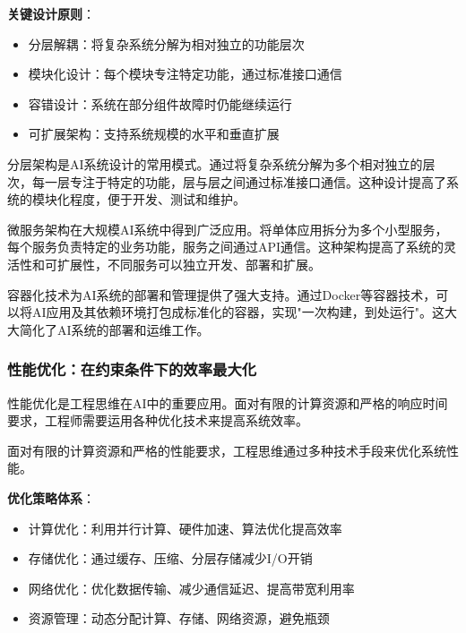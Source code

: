 
\textbf{关键设计原则}：
\begin{itemize}
\item 分层解耦：将复杂系统分解为相对独立的功能层次
\item 模块化设计：每个模块专注特定功能，通过标准接口通信
\item 容错设计：系统在部分组件故障时仍能继续运行
\item 可扩展架构：支持系统规模的水平和垂直扩展
\end{itemize}

分层架构是AI系统设计的常用模式。通过将复杂系统分解为多个相对独立的层次，每一层专注于特定的功能，层与层之间通过标准接口通信。这种设计提高了系统的模块化程度，便于开发、测试和维护。

微服务架构在大规模AI系统中得到广泛应用。将单体应用拆分为多个小型服务，每个服务负责特定的业务功能，服务之间通过API通信。这种架构提高了系统的灵活性和可扩展性，不同服务可以独立开发、部署和扩展。

容器化技术为AI系统的部署和管理提供了强大支持。通过Docker等容器技术，可以将AI应用及其依赖环境打包成标准化的容器，实现"一次构建，到处运行"。这大大简化了AI系统的部署和运维工作。

\subsubsection{性能优化：在约束条件下的效率最大化}

性能优化是工程思维在AI中的重要应用。面对有限的计算资源和严格的响应时间要求，工程师需要运用各种优化技术来提高系统效率。

面对有限的计算资源和严格的性能要求，工程思维通过多种技术手段来优化系统性能。

\textbf{优化策略体系}：
\begin{itemize}
\item 计算优化：利用并行计算、硬件加速、算法优化提高效率
\item 存储优化：通过缓存、压缩、分层存储减少I/O开销
\item 网络优化：优化数据传输、减少通信延迟、提高带宽利用率
\item 资源管理：动态分配计算、存储、网络资源，避免瓶颈
\end{itemize}

%
%

